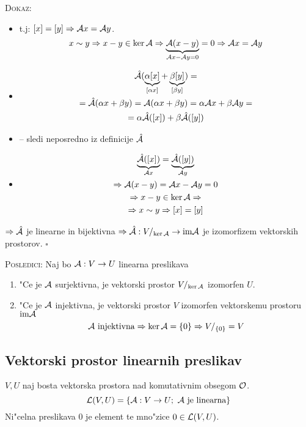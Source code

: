 \textsc{Dokaz:}
\begin{itemize}
	\item {} t.j: $[x] = [y] \Rightarrow \mathcal{A} x = \mathcal{A} y$.
	\begin{equation*}
	x \sim y \Rightarrow x - y \in \ker \mathcal{A} \Rightarrow \underbrace{\mathcal{A}(x-y)}_{\mathcal{A} x - \mathcal{A} y = 0} = 0 \Rightarrow \mathcal{A} x = \mathcal{A} y
	\end{equation*}

	\item {}
	\begin{multline*}
	\hat{\mathcal{A}}(\underbrace{\alpha[x]}_{[\alpha x]} + \underbrace{\beta[y]}_{[\beta y]}) = \\
	=\hat{\mathcal{A}}(\alpha x + \beta y) = \mathcal{A}(\alpha x + \beta y) = \alpha \mathcal{A} x + \beta \mathcal{A} y =\\
	= \alpha \hat{\mathcal{A}}([x]) + \beta \hat{\mathcal{A}}([y])
	\end{multline*}
	
	\item {} -- sledi neposredno iz definicije $\hat{\mathcal{A}}$
	\item {}
	\begin{gather*}
	\underbrace{\hat{\mathcal{A}}([x])}_{\mathcal{A} x} = \underbrace{\hat{\mathcal{A}}([y])}_{\mathcal{A} y} \\
	\Rightarrow \mathcal{A} (x-y) = \mathcal{A} x - \mathcal{A} y = 0 \\
	\Rightarrow x - y \in \ker \mathcal{A} \Rightarrow \\
	\Rightarrow x \sim y \Rightarrow [x] = [y]
	\end{gather*}
\end{itemize}
$\Rightarrow \hat{\mathcal{A}}$ je linearne in bijektivna $\Rightarrow \hat{\mathcal{A}}: V/_{\ker \mathcal{A}} \to \text{im} \mathcal{A}$ je izomorfizem vektorskih prostorov. \hfill $\square$

\textsc{Posledici:} Naj bo $\mathcal{A}: V \to U$ linearna preslikava
\begin{enumerate}[(1)]
	\item "Ce je $\mathcal{A}$ surjektivna, je vektorski prostor $V/_{\ker \mathcal{A}}$ izomorfen $U$.
	\item "Ce je $\mathcal{A}$ injektivna, je vektorski prostor $V$ izomorfen vektorskemu prostoru $\text{im} \mathcal{A}$
	\begin{equation*}
	\mathcal{A} \text{ injektivna} \Rightarrow \ker \mathcal{A} = \{0\} \Rightarrow V/_{\{0\}} = V
	\end{equation*}
\end{enumerate}
%
\subsection{Vektorski prostor linearnih preslikav}
$V, U$ naj bosta vektorska prostora nad komutativnim obsegom $\mathcal{O}$.
\begin{equation*}
\mathcal{L}(V, U) = \{\mathcal{A}: V \to U; \text{ $\mathcal{A}$ je linearna}\}
\end{equation*}
Ni"celna preslikava 0 je element te mno"zice $0 \in \mathcal{L}(V, U)$.

